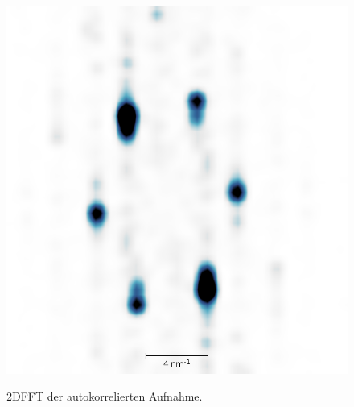 \begin{figure}
    \caption{
    2DFFT der autokorrelierten Aufnahme.}
    \includegraphics[width=0.6 \textwidth ]{pics/fourier5}
    \label{fig:fourier5}
\end{figure}



\clearpage
